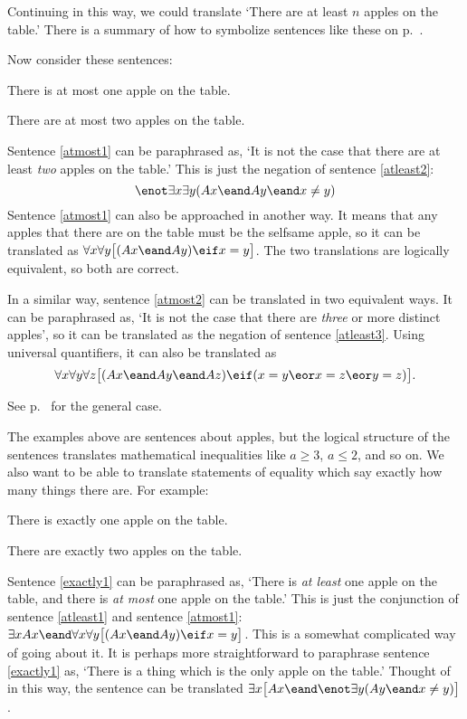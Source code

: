 Continuing in this way, we could translate `There are at least $n$ apples on the table.' There is a summary of how to symbolize sentences like these on p.~\pageref{summary.atleast}.


Now consider these sentences:
\begin{earg}
\item[\ex{atmost1}] There is at most one apple on the table.
\item[\ex{atmost2}] There are at most two apples on the table.
\end{earg}

Sentence \ref{atmost1} can be paraphrased as, `It is not the case that there are at least \emph{two} apples on the table.' This is just the negation of sentence \ref{atleast2}: $$\enot \exists x \exists y(Ax \eand Ay \eand x\neq y)$$
Sentence \ref{atmost1} can also be approached in another way. It means that any apples that there are on the table must be the selfsame apple, so it can be translated as $\forall x\forall y\bigl[(Ax \eand Ay) \eif x=y\bigr]$. The two translations are logically equivalent, so both are correct.

In a similar way, sentence \ref{atmost2} can be translated in two equivalent ways. It can be paraphrased as, `It is not the case that there are \emph{three} or more distinct apples', so it can be translated as the negation of sentence \ref{atleast3}. Using universal quantifiers, it can also be translated as
$$\forall x\forall y\forall z\bigl[(Ax \eand Ay \eand Az) \eif (x=y \eor x=z \eor y=z)\bigr].$$

See p.~\pageref{summary.atmost} for the general case.

The examples above are sentences about apples, but the logical structure of the sentences translates mathematical inequalities like $a\geq 3$, $a \leq 2$, and so on. We also want to be able to translate statements of equality which say exactly how many things there are. For example:
\begin{earg}
\item[\ex{exactly1}] There is exactly one apple on the table.
\item[\ex{exactly2}] There are exactly two apples on the table.
\end{earg}

Sentence \ref{exactly1} can be paraphrased as, `There is \emph{at least} one apple on the table, and there is \emph{at most} one apple on the table.' This is just the conjunction of sentence \ref{atleast1} and sentence \ref{atmost1}: $\exists x Ax \eand \forall x\forall y\bigl[(Ax \eand Ay) \eif x=y\bigr]$. This is a somewhat complicated way of going about it. It is perhaps more straightforward to paraphrase sentence \ref{exactly1} as, `There is a thing which is the only apple on the table.' Thought of in this way, the sentence can be translated $\exists x\bigl[Ax \eand \enot\exists y(Ay \eand x\neq y)\bigr]$.

